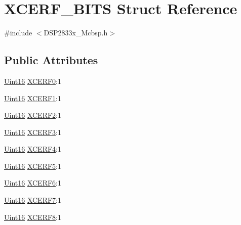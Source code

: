 \hypertarget{struct_x_c_e_r_f___b_i_t_s}{}\section{X\+C\+E\+R\+F\+\_\+\+B\+I\+T\+S Struct Reference}
\label{struct_x_c_e_r_f___b_i_t_s}


{\ttfamily \#include $<$D\+S\+P2833x\+\_\+\+Mcbsp.\+h$>$}

\subsection*{Public Attributes}
\begin{DoxyCompactItemize}
\item 
\hyperlink{_d_s_p2833x___device_8h_a59a9f6be4562c327cbfb4f7e8e18f08b}{Uint16} \hyperlink{struct_x_c_e_r_f___b_i_t_s_a5e8d8d25d7e7e35e2275f8da462c0863}{X\+C\+E\+R\+F0}\+:1
\item 
\hyperlink{_d_s_p2833x___device_8h_a59a9f6be4562c327cbfb4f7e8e18f08b}{Uint16} \hyperlink{struct_x_c_e_r_f___b_i_t_s_a23015ebe1a6caee53c236a5898e028fc}{X\+C\+E\+R\+F1}\+:1
\item 
\hyperlink{_d_s_p2833x___device_8h_a59a9f6be4562c327cbfb4f7e8e18f08b}{Uint16} \hyperlink{struct_x_c_e_r_f___b_i_t_s_acc1ce63763187ab71df6c44c7cda5701}{X\+C\+E\+R\+F2}\+:1
\item 
\hyperlink{_d_s_p2833x___device_8h_a59a9f6be4562c327cbfb4f7e8e18f08b}{Uint16} \hyperlink{struct_x_c_e_r_f___b_i_t_s_ae58a96441fdca115aff56ca60c4dd155}{X\+C\+E\+R\+F3}\+:1
\item 
\hyperlink{_d_s_p2833x___device_8h_a59a9f6be4562c327cbfb4f7e8e18f08b}{Uint16} \hyperlink{struct_x_c_e_r_f___b_i_t_s_a338ea10647b7c813ad2c01ef3c72894a}{X\+C\+E\+R\+F4}\+:1
\item 
\hyperlink{_d_s_p2833x___device_8h_a59a9f6be4562c327cbfb4f7e8e18f08b}{Uint16} \hyperlink{struct_x_c_e_r_f___b_i_t_s_a2630e738fc2322966611cb1b7de47029}{X\+C\+E\+R\+F5}\+:1
\item 
\hyperlink{_d_s_p2833x___device_8h_a59a9f6be4562c327cbfb4f7e8e18f08b}{Uint16} \hyperlink{struct_x_c_e_r_f___b_i_t_s_a82e1e5592ac77b2b11e875d0bc68c353}{X\+C\+E\+R\+F6}\+:1
\item 
\hyperlink{_d_s_p2833x___device_8h_a59a9f6be4562c327cbfb4f7e8e18f08b}{Uint16} \hyperlink{struct_x_c_e_r_f___b_i_t_s_a34cb12f26ffd813af9a9f53e80d709e7}{X\+C\+E\+R\+F7}\+:1
\item 
\hyperlink{_d_s_p2833x___device_8h_a59a9f6be4562c327cbfb4f7e8e18f08b}{Uint16} \hyperlink{struct_x_c_e_r_f___b_i_t_s_a834f2eac63bc87f7f8ce98df9f946d79}{X\+C\+E\+R\+F8}\+:1

\end{DoxyCompactItemize}
